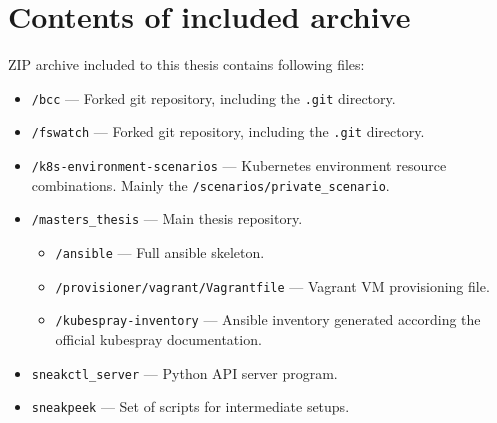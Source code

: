 \setcounter{figure}{0}
\setcounter{listing}{0}
\appendixpagenumbering

\chapter{Contents of included archive \label{appendix:contents} }

ZIP archive included to this thesis contains following files:

\begin{itemize}[noitemsep]
\item \texttt{/bcc} --- Forked git repository, including the \texttt{.git} directory.
\item \texttt{/fswatch} --- Forked git repository, including the \texttt{.git} directory.
\item \texttt{/k8s-environment-scenarios} --- Kubernetes environment resource combinations. Mainly the \texttt{/scenarios/private\_scenario}.
\item \texttt{/masters\_thesis} --- Main thesis repository.
\begin{itemize}
	\item \texttt{/ansible} --- Full ansible skeleton.
	\item \texttt{/provisioner/vagrant/Vagrantfile} --- Vagrant VM provisioning file.
	\item \texttt{/kubespray-inventory} --- Ansible inventory generated according the official kubespray documentation.
\end{itemize}
\item \texttt{sneakctl\_server} --- Python API server program.
\item \texttt{sneakpeek} --- Set of scripts for intermediate setups.
\end{itemize}


